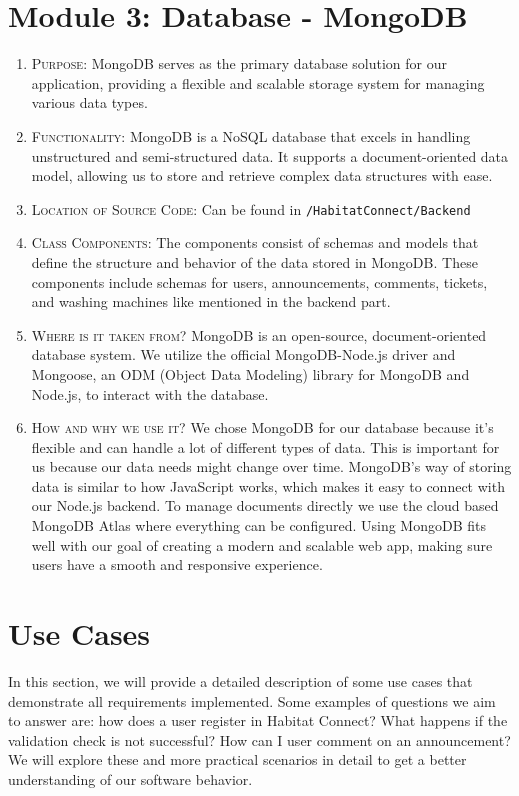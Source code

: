 \documentclass[conference]{IEEEtran}
\begin{document}
\section*{Module 3: Database - MongoDB}
\begin{enumerate}
    \item \textsc{Purpose:} MongoDB serves as the primary database solution for our application, providing a flexible and scalable storage system for managing various data types.
    \item \textsc{Functionality:} MongoDB is a NoSQL database that excels in handling unstructured and semi-structured data. It supports a document-oriented data model, allowing us to store and retrieve complex data structures with ease.
    \item \textsc{Location of Source Code:} Can be found in \texttt{/HabitatConnect/Backend}
    \item \textsc{Class Components:} The components consist of schemas and models that define the structure and behavior of the data stored in MongoDB. These components include schemas for users, announcements, comments, tickets, and washing machines like mentioned in the backend part.
    \item \textsc{Where is it taken from?} MongoDB is an open-source, document-oriented database system. We utilize the official MongoDB-Node.js driver and Mongoose, an ODM (Object Data Modeling) library for MongoDB and Node.js, to interact with the database.
    \item \textsc{How and why we use it?} We chose MongoDB for our database because it's flexible and can handle a lot of different types of data. This is important for us because our data needs might change over time. MongoDB's way of storing data is similar to how JavaScript works, which makes it easy to connect with our Node.js backend. To manage documents directly we use the cloud based MongoDB Atlas where everything can be configured. Using MongoDB fits well with our goal of creating a modern and scalable web app, making sure users have a smooth and responsive experience.
\end{enumerate}



\section{Use Cases}
In this section, we will provide a detailed description of some use cases that demonstrate all requirements implemented. Some examples of questions we aim to answer are: how does a user register in Habitat Connect? What happens if the validation check is not successful? How can I user comment on an announcement? We will explore these and more practical scenarios in detail to get a better understanding of our software behavior.
\end{document}
